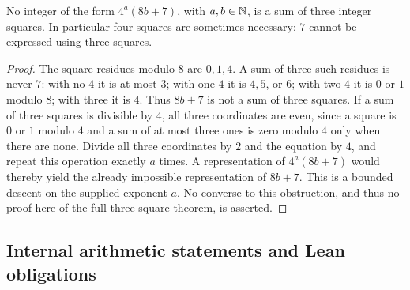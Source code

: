 \begin{proposition}
\label{qr:three-obstruction}
No integer of the form $4^a(8b+7)$, with $a,b\in\mathbb N$, is a sum
of three integer squares. In particular four squares are sometimes
necessary: $7$ cannot be expressed using three squares.
\end{proposition}
\begin{proof}
The square residues modulo $8$ are $0,1,4$. A sum of three such
residues is never $7$: with no $4$ it is at most $3$; with one $4$
it is $4,5$, or $6$; with two $4$ it is $0$ or $1$ modulo $8$;
with three it is $4$. Thus $8b+7$ is not a sum of three squares.
If a sum of three squares is divisible by $4$, all three coordinates
are even, since a square is $0$ or $1$ modulo $4$ and a sum of at
most three ones is zero modulo $4$ only when there are none. Divide
all three coordinates by $2$ and the equation by $4$, and repeat
this operation exactly $a$ times. A representation of
$4^a(8b+7)$ would thereby yield the already impossible representation
of $8b+7$. This is a bounded descent on the supplied exponent $a$.
No converse to this obstruction, and thus no proof here of the full
three-square theorem, is asserted.
\end{proof}

\subsection{Internal arithmetic statements and Lean obligations}
\label{qr:formalization}

